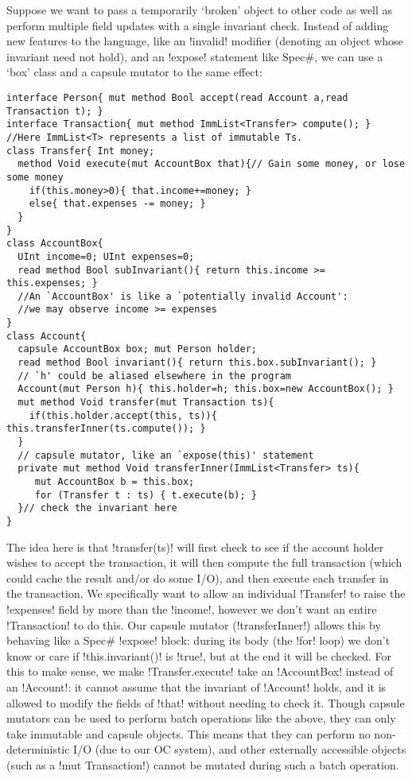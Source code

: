  Suppose we want to pass a temporarily `broken' object to other code as well as perform multiple field updates with a single invariant check. 
Instead of adding new features to the language, like an \Q!invalid! modifier (denoting an object whose invariant need not hold), and an \Q!expose! statement like Spec\#, we can use a `box' class and a capsule mutator to the same effect:
\begin{lstlisting}
interface Person{ mut method Bool accept(read Account a,read Transaction t); }
interface Transaction{ mut method ImmList<Transfer> compute(); }
//Here ImmList<T> represents a list of immutable Ts.
class Transfer{ Int money;
  method Void execute(mut AccountBox that){// Gain some money, or lose some money
    if(this.money>0){ that.income+=money; }
    else{ that.expenses -= money; }
  }
}
class AccountBox{
  UInt income=0; UInt expenses=0;
  read method Bool subInvariant(){ return this.income >= this.expenses; }
  //An `AccountBox' is like a `potentially invalid Account':
  //we may observe income >= expenses
}
class Account{
  capsule AccountBox box; mut Person holder;
  read method Bool invariant(){ return this.box.subInvariant(); }
  // `h' could be aliased elsewhere in the program
  Account(mut Person h){ this.holder=h; this.box=new AccountBox(); }
  mut method Void transfer(mut Transaction ts){
    if(this.holder.accept(this, ts)){ this.transferInner(ts.compute()); }
  }
  // capsule mutator, like an `expose(this)' statement
  private mut method Void transferInner(ImmList<Transfer> ts){
     mut AccountBox b = this.box;
     for (Transfer t : ts) { t.execute(b); }
  }// check the invariant here
}
\end{lstlisting}
The idea here is that \Q!transfer(ts)! will first check to see if the account holder wishes to accept the transaction, it will then compute the full transaction (which could cache the result and/or do some I/O), and then execute each transfer in the transaction. We specifically want to allow an individual \Q!Transfer! to raise the \Q!expenses! field by more than the \Q!income!, however we don't want an entire \Q!Transaction! to do this. 
Our capsule mutator (\Q!transferInner!) allows this by behaving like a Spec\# \Q!expose! block: during its body (the \Q!for! loop) we don't know or care if \Q!this.invariant()! is \Q!true!, but at the end it will be checked. For this to make sense, we make \Q!Transfer.execute! take an \Q!AccountBox! instead of an \Q!Account!: it cannot assume that the invariant of \Q!Account! holds, and it is allowed to modify the fields of \Q!that! without needing to check it. Though capsule mutators can be used to perform batch operations like the above, they can only take immutable and capsule objects. This means that they can perform no non-deterministic I/O (due to our OC system), and other externally accessible objects (such as a \Q!mut Transaction!) cannot be mutated during such a batch operation.

